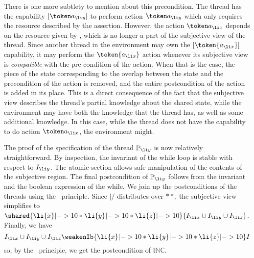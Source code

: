 There is one more subtlety to mention about this precondition.  The
thread has the capability $[\token a_{\li y}]$ to perform action $\token
a_{\li y}$ which only requires the resource described by the
assertion. However, the action $\token a_{\li x}$ depends on the
resource given by , which is no longer a part of the subjective view
of the thread. Since another thread in the environment may own the $[\token{a_{\li x}}]$ capability, it may perform the $\token{a_{\li x}}$ action whenever its subjective view is {\em compatible} with the pre-condition of the action.
When that is the case, the piece of the
state corresponding to the overlap between the state and the
precondition of the action is removed, and the entire postcondition of
the action is added in its place.%
This is a direct consequence of the fact that the subjective view
describes the thread's partial knowledge about the shared state, while
the environment may have both the knowledge that the thread
has, as well as some additional knowledge. In this case, while the thread
does not have the capability to do action $\token a_{\li x}$, the
environment might.




The proof of the specification of the thread $\mathbb{P}_{\li y}$ is 
now relatively straightforward. By inspection, the invariant of the while loop is stable
with respect to $I_{\li y}$. The atomic section allows safe
manipulation of the contents of the subjective region.
 The final postcondition of $\mathbb{P}_{\li y}$ follows from the
invariant and the boolean expression of the while. We join up the
postconditions of the threads using the \mergeRule\ principle. Since $|/$
distributes over $**$, the subjective view simplifies to $
\shared{\li{x}|->10 * \li{y}|->10 * \li{z}|->10}{I_{\li x}\cup I_{\li y}\cup I_{\li z}} $.
Finally, we have 
\[
I_{\li x}\cup I_{\li y}\cup I_{\li z}\weakenIb{\li{x}|->10 * \li{y}|->10 * \li{z}|->10} I
\]
so, by the \shiftRule\ principle, we get the postcondition of $\mathbb{INC}$. 


